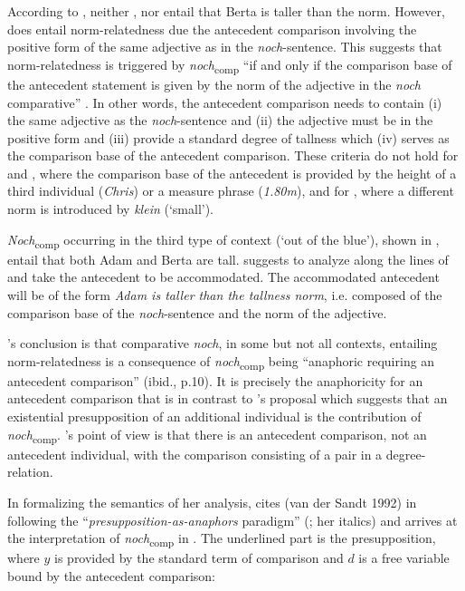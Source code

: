 \documentclass[output=paper,
modfonts
]{langscibook}
\begin{document}
\noindent According to \citet{umbach2009a_comp}, neither ,  nor  entail that Berta is taller than the norm. However,  does entail norm-relatedness due the antecedent comparison involving the positive form of the same adjective as in the \textit{noch}-sentence. This suggests that norm-relatedness is triggered by \textit{noch}\textsubscript{comp} ``if and only if the comparison base of the antecedent statement is given by the norm of the adjective in the \textit{noch} comparative'' \citep[p.10]{umbach2009a_comp}. In other words, the antecedent comparison needs to contain (i) the same adjective as the \textit{noch}-sentence and (ii) the adjective must be in the positive form and (iii) provide a standard degree of tallness which (iv) serves as the comparison base of the antecedent comparison. These criteria do not hold for  and , where the comparison base of the antecedent is provided by the height of a third individual (\textit{Chris}) or a measure phrase (\textit{1.80m}), and for , where a different norm is introduced by \textit{klein} (`small').

\textit{Noch}\textsubscript{comp} occurring in the third type of context (`out of the blue'), shown in , entail that both Adam and Berta are tall. \citeauthor{umbach2009a_comp} suggests to analyze  along the lines of  and take the antecedent to be accommodated. The accommodated antecedent will be of the form \textit{Adam is taller than the tallness norm}, i.e. composed of the comparison base of the \textit{noch}-sentence and the norm of the adjective.

\citeauthor{umbach2009a_comp}'s \citeyearpar{umbach2009a_comp} conclusion is that comparative \textit{noch}, in some but not all contexts, entailing norm-relatedness is a consequence of \textit{noch}\textsubscript{comp} being ``anaphoric requiring an antecedent comparison'' (ibid., p.10). It is precisely the anaphoricity for an antecedent comparison that is in contrast to \citeauthor{koenig1977}'s \citeyearpar{koenig1977} proposal which suggests that an existential presupposition of an additional individual is the contribution of \textit{noch}\textsubscript{comp}. \citeauthor{umbach2009a_comp}'s \citeyearpar{umbach2009a_comp} point of view is that there is an antecedent comparison, not an antecedent individual, with the comparison consisting of a pair in a degree-relation.


In formalizing the semantics of her analysis, \citeauthor{umbach2009a_comp} cites (van der Sandt 1992) in following the ``\textit{presupposition-as-anaphors} paradigm'' (\citealt[11]{umbach2009a_comp}; her italics) and arrives at the interpretation of \textit{noch}\textsubscript{comp} in . The underlined part is the presupposition, where $y$ is provided by the standard term of comparison and $d$ is a free variable bound by the antecedent comparison:
\end{document}
